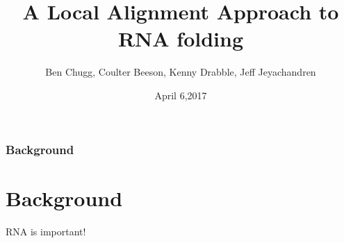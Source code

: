 \documentclass{beamer}
\title{A Local Alignment Approach to RNA folding}
\author{Ben Chugg, Coulter Beeson, Kenny Drabble, Jeff Jeyachandren}
\institute{University of British Columbia}
\date{April 6,2017}
\begin{document}
\begin{frame}
\titlepage
\end{frame}

\begin{frame}
\frametitle{Background}
\section*{Background}
RNA is important!  
\end{frame}
\end{document}
